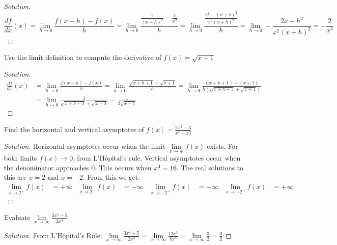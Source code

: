\documentclass[crop=false,class=book,oneside]{standalone}
\begin{document}
            \begin{proof}[Solution]
            \begin{equation*}
                \frac{df}{dx}(x)=\underset{h\rightarrow 0}{\lim}\frac{f(x+h)-f(x)}{h}=\underset{h\rightarrow 0}{\lim}\frac{\frac{1}{(x+h)^{2}}-\frac{1}{x^{2}}}{h}=\underset{h\rightarrow 0}{\lim}\frac{\frac{x^{2}-(x+h)^{2}}{x^{2}(x+h)^{2}}}{h}=\underset{h\rightarrow 0}{\lim}-\frac{2x+h^{2}}{x^{2}(x+h)^{2}}=-\frac{2}{x^{3}}
            \end{equation*}
            \end{proof}
            \begin{problem}
            Use the limit definition to compute the derivative of $f(x)=\sqrt{x+1}$
            \end{problem}
            \begin{proof}[Solution]
            \begin{align*}
                \frac{df}{dx}(x)&=\underset{h\rightarrow 0}{\lim}\frac{f(x+h)-f(x)}{h}=\underset{h\rightarrow 0}{\lim}\frac{\sqrt{x+h+1}-\sqrt{x+1}}{h}=\underset{h\rightarrow 0}{\lim}\frac{(x+h+1)-(x+1)}{h(\sqrt{x+h+1}+\sqrt{x+1})}\\
                &=\underset{h\rightarrow 0}{\lim}\frac{1}{\sqrt{x+h+1}+\sqrt{x+1}}=\frac{1}{2\sqrt{x+1}}
            \end{align*}
            \end{proof}
            \begin{problem}
            Find the horizontal and vertical asymptotes of $f(x)=\frac{2x^{3}-3}{x^{4}-16}$
            \end{problem}
            \begin{proof}[Solution]
            Horizontal asymptotes occur when the limit $\underset{x\rightarrow\pm}{\lim}f(x)$ exists. For both limits $f(x)\rightarrow 0$, from L'H\^{o}pital's rule. Vertical asymptotes occur when the denominator approaches 0. This occurs when $x^{4}=16$. The real solutions to this are $x=2$ and $x=-2$. From this we get:
            \begin{align*}
                \underset{x\rightarrow 2^{+}}{\lim}f(x)&=+\infty&\underset{x\rightarrow 2^{-}}{\lim}f(x)&=-\infty&\underset{x\rightarrow -2^{+}}{\lim}f(x)&=-\infty&\underset{x\rightarrow -2^{-}}{\lim}f(x)&=+\infty
            \end{align*}
            \end{proof}
            \begin{problem}
            Evaluate $\underset{x\rightarrow\infty}{\lim}\frac{3x^{4}+5}{2x^{4}}$
            \end{problem}
            \begin{proof}[Solution]
            From L'H\^{o}pital's Rule: $\underset{x\rightarrow\infty}{\lim}\frac{3x^{4}+5}{2x^{4}}=\underset{x\rightarrow\infty}{\lim}\frac{12x^{3}}{8x^{3}}=\underset{x\rightarrow \infty}{\lim}\frac{3}{2}=\frac{3}{2}$
            \end{proof}
\end{document}

